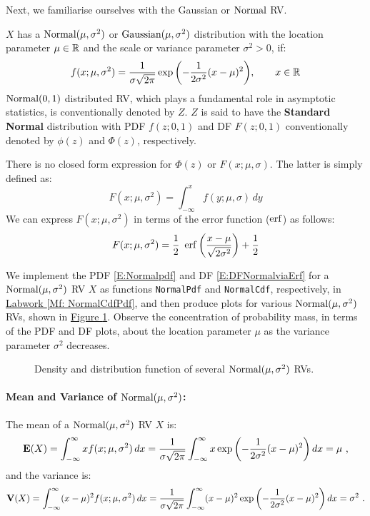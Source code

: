 Next, we familiarise ourselves with the Gaussian or $\mbox{{\rm Normal}}$ RV.
\begin{model}
$X$ has a $\mbox{{\rm Normal}}(\mu,\sigma^2)$ or $\mbox{{\rm Gaussian}}(\mu,\sigma^2)$ distribution with the location parameter $\mu \in \mathbb{R}$ and the scale or variance parameter $\sigma^2 > 0$, if:
\begin{equation}\label{E:Normalpdf}
f(x; \mu, \sigma^2) = \frac{1}{\sigma \sqrt{2 \pi}}
 \exp{\left( - \frac{1}{2 \sigma^2} (x-\mu)^2 \right)}, \qquad x \in \mathbb{R}
\end{equation}
$\mbox{{\rm Normal}}(0,1)$ distributed RV, which plays a fundamental role in asymptotic statistics, is conventionally denoted by $Z$.  $Z$ is said to have the {\bf Standard Normal} distribution with PDF $f(z; 0,1)$ and DF $F(z;0,1)$ conventionally denoted by $\phi(z)$ and $\Phi(z)$, respectively.

There is no closed form expression for $\Phi(z)$ or $F(x;\mu,\sigma)$.  The latter is simply defined as:
\[
F(x;\mu,\sigma^2) = \int_{-\infty}^x f(y;\mu,\sigma)\,dy
\]
We can express $F(x;\mu,\sigma^2)$ in terms of the error function ($\operatorname{erf}$) as follows:
\begin{equation}\label{E:DFNormalviaErf}
F(x;\mu,\sigma^2) = \frac{1}{2} \ \operatorname{erf} \left(  \frac{x-\mu}{\sqrt{2 \sigma^2}} \right)+ \frac{1}{2}
\end{equation}
\end{model}
We 
implement the PDF \eqref{E:Normalpdf} and DF \eqref{E:DFNormalviaErf} for a $\mbox{{\rm Normal}}(\mu,\sigma^2)$ RV $X$ as \Matlab functions {\tt NormalPdf} and {\tt NormalCdf}, respectively, in \hyperref[Mf: NormalCdfPdf]{Labwork \ref*{Mf: NormalCdfPdf}},  and then 
produce plots for various $\mbox{{\rm Normal}}(\mu,\sigma^2)$ RVs, shown in \hyperref[F:plotPdfCdfNormals]{Figure \ref*{F:plotPdfCdfNormals}}.  Observe the concentration of probability mass, in terms of the PDF and DF plots, about the location parameter $\mu$ as the variance parameter $\sigma^2$ decreases.
\begin{figure}[htpb]
\caption{Density and distribution function of several $\mbox{{\rm Normal}}(\mu,\sigma^2)$ RVs.\label{F:plotPdfCdfNormals}}
\centering   {}
\end{figure}

\paragraph{Mean and Variance of $\mbox{{\rm Normal}}(\mu,\sigma^2)$:}
The mean of a $\mbox{{\rm Normal}}(\mu,\sigma^2)$ RV $X$ is:
\[
\mathbf{E}(X) = \int_{-\infty}^{\infty} x f(x;\mu,\sigma^2)\,dx
=   \frac{1}{\sigma \sqrt{2 \pi}} \int_{-\infty}^{\infty} x
 \exp{\left( - \frac{1}{2 \sigma^2} (x-\mu)^2 \right)}\,dx
= \mu \ ,
\]
and the variance is:
\[
\mathbf{V}(X) = \int_{-\infty}^{\infty} (x-\mu)^2 f(x;\mu,\sigma^2)\,dx
=   \frac{1}{\sigma \sqrt{2 \pi}} \int_{-\infty}^{\infty} (x-\mu)^2
 \exp{\left( - \frac{1}{2 \sigma^2} (x-\mu)^2 \right)}\,dx
= \sigma^2 \ .
\]

